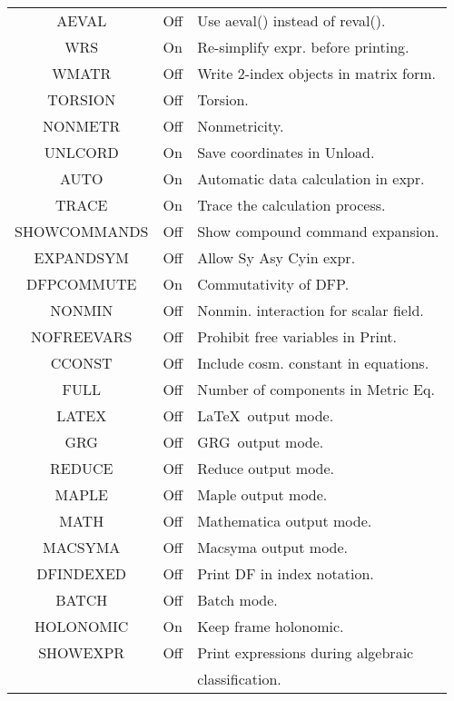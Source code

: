 \documentclass[twocolumn]{article}
\newcommand{\grgtt}{\ttfamily}
\renewcommand{\tt}{\grgtt}
\newcommand{\grg}{GRG}
\begin{document}
\begin{tabular}{|c|c|l|}
\hline
\tt  AEVAL          & Off & Use aeval() instead of reval().          \\
\tt  WRS            & On  & Re-simplify expr. before printing.     \\
\tt  WMATR          & Off & Write 2-index objects in matrix form.   \\
\tt  TORSION        & Off & Torsion.                                 \\
\tt  NONMETR        & Off & Nonmetricity.                            \\
\tt  UNLCORD        & On  & Save coordinates in {\tt Unload}.       \\
\tt  AUTO           & On  & Automatic data calculation in expr.    \\
\tt  TRACE          & On  & Trace the calculation process.          \\
\tt  SHOWCOMMANDS   & Off & Show compound command expansion.       \\
\tt  EXPANDSYM      & Off & Allow {\tt Sy Asy Cy}in expr.        \\
\tt  DFPCOMMUTE     & On  & Commutativity of {\tt DFP}.              \\
\tt  NONMIN         & Off & Nonmin. interaction for scalar field.    \\
\tt  NOFREEVARS     & Off & Prohibit free variables in {\tt Print}. \\
\tt  CCONST         & Off & Include cosm. constant in equations.    \\
\tt  FULL           & Off & Number of components in {\tt Metric Eq}. \\
\tt  LATEX          & Off &  \LaTeX\ output mode.                    \\
\tt  GRG            & Off &  \grg\ output mode.                      \\
\tt  REDUCE         & Off &  {\sc Reduce} output mode.               \\
\tt  MAPLE          & Off &  {\sc Maple} output mode.                \\
\tt  MATH           & Off &  {\sc Mathematica} output mode.          \\
\tt  MACSYMA        & Off &  {\sc Macsyma} output mode.              \\
\tt  DFINDEXED      & Off & Print {\tt DF} in index notation.       \\
\tt  BATCH          & Off & Batch mode.                              \\
\tt  HOLONOMIC      & On  & Keep frame holonomic.   \\
\tt  SHOWEXPR       & Off & Print expressions during algebraic      \\
\tt          	    &     & classification.                          \\
\hline
\end{tabular}
\end{document}
